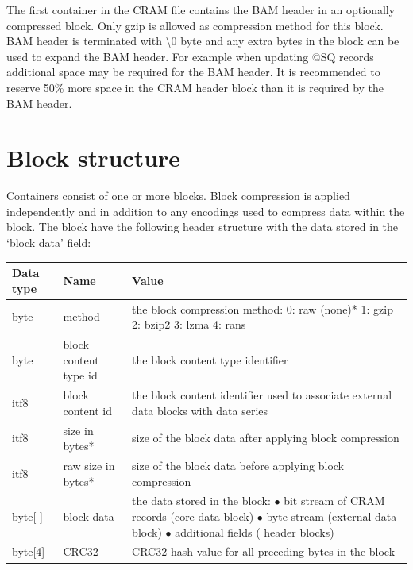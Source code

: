 \documentclass[a4paper]{article}
\begin{document}
The first container in the CRAM file contains the BAM header in an optionally
compressed block. Only gzip is allowed as compression method for this block. BAM
header is terminated with \textbackslash{}0 byte and any extra bytes in the
block can be used to expand the BAM header. For example when updating @SQ
records additional space may be required for the BAM header. It is recommended
to reserve 50\% more space in the CRAM header block than it is required by the
BAM header.

\section{\textbf{Block structure}}

Containers consist of one or more blocks. Block compression is applied independently 
and in addition to any encodings used to compress data within the block. The block 
have the following header structure with the data stored in the `block data' field:

\begin{tabular}{|l|>{\raggedright}p{120pt}|>{\raggedright}p{260pt}|}
\hline
\textbf{Data type} & \textbf{Name} & \textbf{Value}
\tabularnewline
\hline
byte & method & the block compression method: \linebreak{}
0: raw (none)*\linebreak{}
1: gzip\linebreak{}
2: bzip2\linebreak{}
3: lzma\linebreak{}
4: rans\tabularnewline
\hline
byte & block content type id & the block content type identifier\tabularnewline
\hline
itf8 & block content id & the block content identifier used to associate external 
data blocks with data series\tabularnewline
\hline
itf8 & size in bytes* & size of the block data after applying block compression\tabularnewline
\hline
itf8 & raw size in bytes* & size of the block data before applying block compression\tabularnewline
\hline
byte[ ] & block data & the data stored in the block:\linebreak{}
$\bullet$ bit stream of CRAM records (core data block)\linebreak{}
$\bullet$ byte stream (external data block)\linebreak{}
$\bullet$ additional fields ( header blocks)\tabularnewline
\hline
byte[4] & CRC32 & CRC32 hash value for all preceding bytes in the block\tabularnewline
\hline
\end{tabular}
\end{document}
